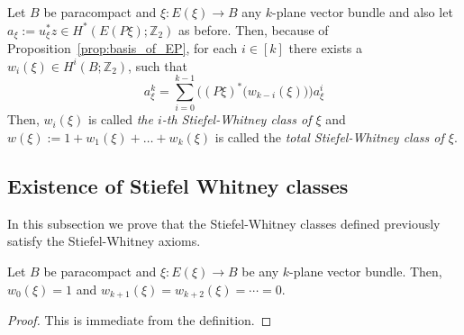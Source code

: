 \begin{definition}\label{def:SW} Let $B$ be paracompact and $\xi:E(\xi)\to B$ any $k$-plane vector bundle and also let $a_{\xi}:=u_{\xi}^*z\in H^*(E(P\xi);\mathbb{Z}_2)$ as before. Then, because of Proposition~\ref{prop:basis_of_EP}, for each $i\in[k]$ there exists a $w_i(\xi)\in H^i(B;\mathbb{Z}_2)$, such that
\[a_{\xi}^k=\sum_{i=0}^{k-1}\Big((P\xi)^*\big(w_{k-i}(\xi)\big)\Big)a_{\xi}^i\]
Then, $w_i(\xi)$ is called \emph{the $i$-th Stiefel-Whitney class of $\xi$} and $w(\xi):=1+w_1(\xi)+\ldots+w_k(\xi)$ is called the \emph{total Stiefel-Whitney class of $\xi$}.
\end{definition}

\subsection{Existence of Stiefel Whitney classes}
In this subsection we prove that the Stiefel-Whitney classes defined previously satisfy the Stiefel-Whitney axioms.
\begin{proposition} Let $B$ be paracompact and $\xi:E(\xi)\to B$ be any $k$-plane vector bundle. Then, $w_0(\xi)=1$ and $w_{k+1}(\xi)=w_{k+2}(\xi)=\cdots=0$.
\end{proposition}
\begin{proof} This is immediate from the definition.
\end{proof}


